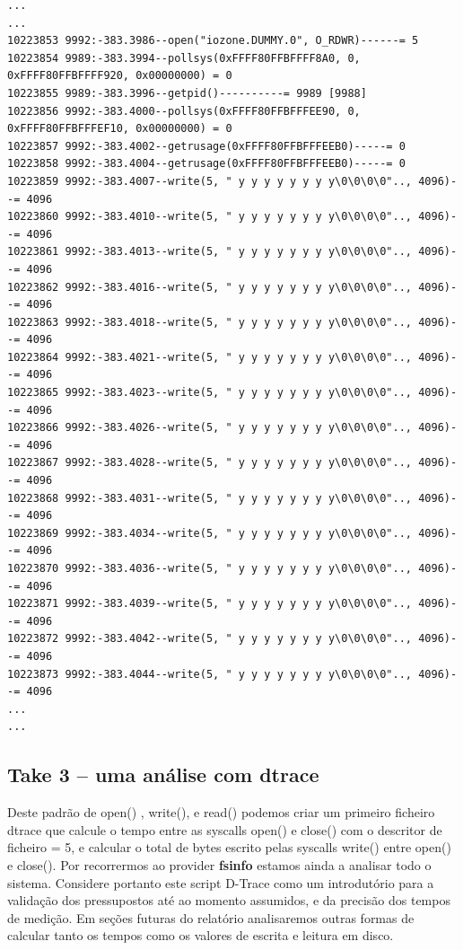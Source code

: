 \documentclass[a4paper]{article}
\begin{document}
{\begin{lstlisting}
...
...
10223853 9992:-383.3986--open("iozone.DUMMY.0", O_RDWR)------= 5
10223854 9989:-383.3994--pollsys(0xFFFF80FFBFFFF8A0, 0, 0xFFFF80FFBFFFF920, 0x00000000) = 0
10223855 9989:-383.3996--getpid()----------= 9989 [9988]
10223856 9992:-383.4000--pollsys(0xFFFF80FFBFFFEE90, 0, 0xFFFF80FFBFFFEF10, 0x00000000) = 0
10223857 9992:-383.4002--getrusage(0xFFFF80FFBFFFEEB0)-----= 0
10223858 9992:-383.4004--getrusage(0xFFFF80FFBFFFEEB0)-----= 0
10223859 9992:-383.4007--write(5, " y y y y y y y y\0\0\0\0".., 4096)--= 4096
10223860 9992:-383.4010--write(5, " y y y y y y y y\0\0\0\0".., 4096)--= 4096
10223861 9992:-383.4013--write(5, " y y y y y y y y\0\0\0\0".., 4096)--= 4096
10223862 9992:-383.4016--write(5, " y y y y y y y y\0\0\0\0".., 4096)--= 4096
10223863 9992:-383.4018--write(5, " y y y y y y y y\0\0\0\0".., 4096)--= 4096
10223864 9992:-383.4021--write(5, " y y y y y y y y\0\0\0\0".., 4096)--= 4096
10223865 9992:-383.4023--write(5, " y y y y y y y y\0\0\0\0".., 4096)--= 4096
10223866 9992:-383.4026--write(5, " y y y y y y y y\0\0\0\0".., 4096)--= 4096
10223867 9992:-383.4028--write(5, " y y y y y y y y\0\0\0\0".., 4096)--= 4096
10223868 9992:-383.4031--write(5, " y y y y y y y y\0\0\0\0".., 4096)--= 4096
10223869 9992:-383.4034--write(5, " y y y y y y y y\0\0\0\0".., 4096)--= 4096
10223870 9992:-383.4036--write(5, " y y y y y y y y\0\0\0\0".., 4096)--= 4096
10223871 9992:-383.4039--write(5, " y y y y y y y y\0\0\0\0".., 4096)--= 4096
10223872 9992:-383.4042--write(5, " y y y y y y y y\0\0\0\0".., 4096)--= 4096
10223873 9992:-383.4044--write(5, " y y y y y y y y\0\0\0\0".., 4096)--= 4096
...
...
\end{lstlisting}
\newpage
\subsection{Take 3 -- uma análise com dtrace}

Deste padrão de open() , write(), e read() podemos criar um primeiro ficheiro dtrace que calcule o tempo entre as syscalls open() e close() com o descritor de ficheiro = 5, e calcular o total de bytes escrito pelas syscalls write() entre open() e close(). Por recorrermos ao provider \textbf{fsinfo} estamos ainda a analisar todo o sistema. Considere portanto este script D-Trace como um introdutório para a validação dos pressupostos até ao momento assumidos, e da precisão dos tempos de medição. Em seções futuras do relatório analisaremos outras formas de calcular tanto os tempos como os valores de escrita e leitura em disco.

}
\end{document}
